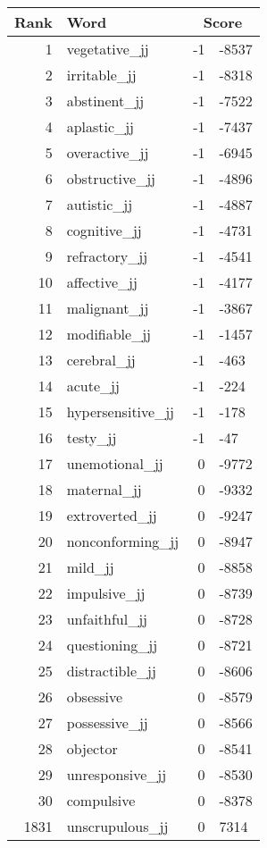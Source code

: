 \begin{longtable}[!htbp]{| rlr@{.}l |}
    \hline
    \textbf{Rank} & \textbf{Word} & \multicolumn{2}{c|}{\textbf{Score}} \\
    \hline
    \endhead
    1 & vegetative\_jj & -1 & -8537 \\
    2 & irritable\_jj & -1 & -8318 \\
    3 & abstinent\_jj & -1 & -7522 \\
    4 & aplastic\_jj & -1 & -7437 \\
    5 & overactive\_jj & -1 & -6945 \\
    6 & obstructive\_jj & -1 & -4896 \\
    7 & autistic\_jj & -1 & -4887 \\
    8 & cognitive\_jj & -1 & -4731 \\
    9 & refractory\_jj & -1 & -4541 \\
    10 & affective\_jj & -1 & -4177 \\
    11 & malignant\_jj & -1 & -3867 \\
    12 & modifiable\_jj & -1 & -1457 \\
    13 & cerebral\_jj & -1 & -463 \\
    14 & acute\_jj & -1 & -224 \\
    15 & hypersensitive\_jj & -1 & -178 \\
    16 & testy\_jj & -1 & -47 \\
    17 & unemotional\_jj & 0 & -9772 \\
    18 & maternal\_jj & 0 & -9332 \\
    19 & extroverted\_jj & 0 & -9247 \\
    20 & nonconforming\_jj & 0 & -8947 \\
    21 & mild\_jj & 0 & -8858 \\
    22 & impulsive\_jj & 0 & -8739 \\
    23 & unfaithful\_jj & 0 & -8728 \\
    24 & questioning\_jj & 0 & -8721 \\
    25 & distractible\_jj & 0 & -8606 \\
    26 & obsessive & 0 & -8579 \\
    27 & possessive\_jj & 0 & -8566 \\
    28 & objector & 0 & -8541 \\
    29 & unresponsive\_jj & 0 & -8530 \\
    30 & compulsive & 0 & -8378 \\
    1831 & unscrupulous\_jj & 0 & 7314 \\

\end{longtable}
